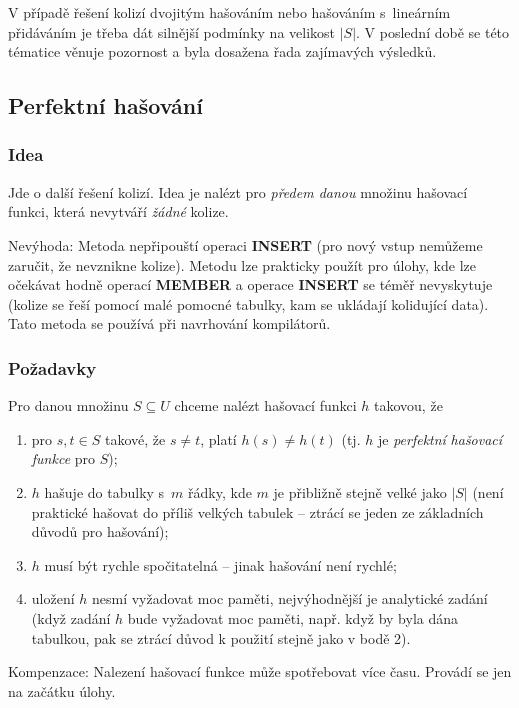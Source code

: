 \documentclass[a4paper,12pt]{article}
\begin{document}
V případě řešení 
kolizí dvojitým hašováním nebo hašováním s~lineárním přidáváním je třeba dát silnější podmínky na velikost $
|S|$. V poslední době se této tématice 
věnuje pozornost a byla dosažena řada zajímavých výsledků.

\subsection{Perfektní hašování}

\subsubsection{Idea}
Jde o další řešení kolizí. Idea 
je nalézt pro \emph{předem danou} množinu hašovací funkci, která 
nevytváří \emph{žádné} kolize.

Nevýhoda: Metoda nepřipouští operaci {\bf INSERT }
(pro nový vstup nemůžeme zaručit, že nevznikne  
kolize). Metodu lze prakticky použít pro úlohy, kde lze 
očekávat hodně operací {\bf MEMBER} a operace {\bf INSERT} se 
téměř nevyskytuje (kolize se řeší pomocí malé pomocné 
tabulky, kam se ukládají kolidují\-cí data). Tato metoda se 
používá při navrhování kompilátorů.

\subsubsection{Požadavky}
\label{pozadavky1234}
Pro danou množinu $S\subseteq 
U$ chceme 
nalézt hašo\-va\-cí funkci $h$ takovou, že
\begin{enumerate}
\item
pro $s,t\in S$ takové, že $s\ne t$, platí $h(s)\ne h(t)$ (tj. $
h$ je \emph{perfektní} \emph{hašovací} \emph{funkce} pro 
$S$); 
\item
$h$ hašuje do tabulky s~$m$ řádky, kde $m$ je přibližně 
stejně velké jako $|S|$ (není praktické hašovat do příliš 
velkých tabulek -- ztrácí se jeden ze základních 
důvodů pro hašování); 
\item
$h$ musí být rychle spočitatelná -- jinak hašování 
není rychlé;
\item
uložení $h$ nesmí vyžadovat moc paměti, 
nejvýhodnější je ana\-lytické zadání (když zadání $
h$ bude 
vyžadovat moc paměti, např. když by byla dána tabulkou, 
pak se ztrácí důvod k použití stejně jako v 
bodě 2).
\end{enumerate}

Kompenzace: Nalezení hašovací funkce 
může spotřebovat více času. Provádí se jen na 
začátku úlohy. 
\end{document}
